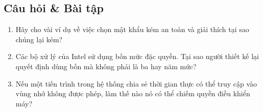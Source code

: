 \subsection*{Câu hỏi \& Bài tập}
\begin{enumerate}
\item Hãy cho vài ví dụ về việc chọn mật khẩu kém an toàn và giải thích tại sao chúng lại
  kém?

\item Các bộ xử lý của Intel sử dụng bốn mức đặc quyền. Tại sao người thiết kế lại quyết
  định dùng bốn mà không phải là ba hay năm mức?

\item Nếu một tiến trình trong hệ thống chia sẻ thời gian thực có thể truy cập vào vùng
  nhớ không được phép, làm thế nào nó có thể chiếm quyền điều khiển máy?
\end{enumerate}
